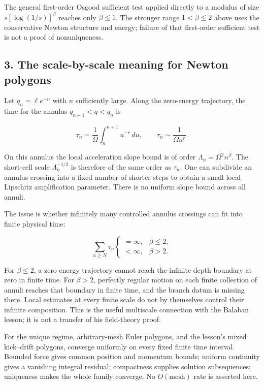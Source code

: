 \documentclass[11pt,a4paper]{article}
\begin{document}
The general first-order Osgood sufficient test applied directly to a
modulus of size \(s[\log(1/s)]^\beta\) reaches only \(\beta\le1\). The
stronger range \(1<\beta\le2\) above uses the conservative Newton
structure and energy; failure of that first-order sufficient test is not
a proof of nonuniqueness.

\subsection{3. The scale-by-scale meaning for Newton
polygons}\label{the-scale-by-scale-meaning-for-newton-polygons}

Let \(q_n=\ell e^{-n}\) with \(n\) sufficiently large. Along the
zero-energy trajectory, the time for the annulus \(q_{n+1}<q<q_n\) is

\[
 \tau_n=\frac1\Omega\int_n^{n+1}u^{-r}\,du,
 \qquad \tau_n\sim\frac1{\Omega n^r}.
 \tag{8}
\]

On this annulus the local acceleration slope bound is of order
\(\Lambda_n=\Omega^2n^\beta\). The short-cell scale \(\Lambda_n^{-1/2}\)
is therefore of the same order as \(\tau_n\). One can subdivide an
annulus crossing into a fixed number of shorter steps to obtain a small
local Lipschitz amplification parameter. There is no uniform slope bound
across all annuli.

The issue is whether infinitely many controlled annulus crossings can
fit into finite physical time:

\[
 \sum_{n\ge N}\tau_n
 \begin{cases}
 =\infty,&\beta\le2,\\
 <\infty,&\beta>2.
 \end{cases}
 \tag{9}
\]

For \(\beta\le2\), a zero-energy trajectory cannot reach the
infinite-depth boundary at zero in finite time. For \(\beta>2\),
perfectly regular motion on each finite collection of annuli reaches
that boundary in finite time, and the branch datum is missing there.
Local estimates at every finite scale do not by themselves control their
infinite composition. This is the useful multiscale connection with the
Balaban lesson; it is not a transfer of his field-theory proof.

For the unique regime, arbitrary-mesh Euler polygons, and the lesson's
mixed kick--drift polygons, converge uniformly on every fixed finite
time interval. Bounded force gives common position and momentum bounds;
uniform continuity gives a vanishing integral residual; compactness
supplies solution subsequences; uniqueness makes the whole family
converge. No \(O(\text{mesh})\) rate is asserted here.
\end{document}
